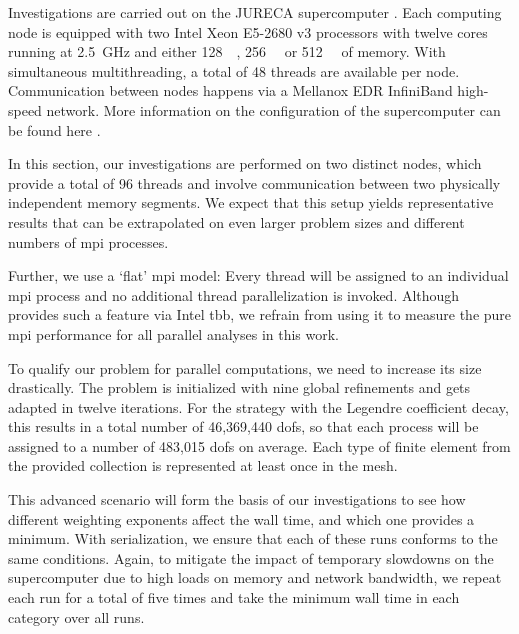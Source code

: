 
Investigations are carried out on the JURECA supercomputer \parencite{krause2016,jureca}. Each computing node is equipped with two Intel\textsuperscript{\textregistered} Xeon\textsuperscript{\textregistered} E5-2680 v3 processors with twelve cores running at \SI{2.5}{\giga\hertz} and either \SI{128}{\giga\byte}, \SI{256}{\giga\byte} or \SI{512}{\giga\byte} of memory. With simultaneous multithreading, a total of 48 threads are available per node. Communication between nodes happens via a Mellanox EDR InfiniBand high-speed network. More information on the configuration of the supercomputer can be found here \textcite{jureca}.

In this section, our investigations are performed on two distinct nodes, which provide a total of 96 threads and involve communication between two physically independent memory segments. We expect that this setup yields representative results that can be extrapolated on even larger problem sizes and different numbers of \gls{mpi} processes.

Further, we use a `flat' \gls{mpi} model: Every thread will be assigned to an individual \gls{mpi} process and no additional thread parallelization is invoked. Although \dealii{} provides such a feature via Intel\textsuperscript{\textregistered} \gls{tbb}, we refrain from using it to measure the pure \gls{mpi} performance for all parallel analyses in this work.


To qualify our problem for parallel computations, we need to increase its size drastically. The problem is initialized with nine global refinements and gets adapted in twelve iterations. For the strategy with the Legendre coefficient decay, this results in a total number of 46,369,440 \glspl{dof}, so that each process will be assigned to a number of 483,015 \glspl{dof} on average. Each type of finite element from the provided collection is represented at least once in the mesh.

This advanced scenario will form the basis of our investigations to see how different weighting exponents affect the wall time, and which one provides a minimum. With serialization, we ensure that each of these runs conforms to the same conditions. Again, to mitigate the impact of temporary slowdowns on the supercomputer due to high loads on memory and network bandwidth, we repeat each run for a total of five times and take the minimum wall time in each category over all runs.

